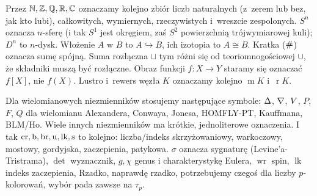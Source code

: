 
Przez $\mathbb N, \mathbb Z, \mathbb Q, \mathbb R, \mathbb C$ oznaczamy kolejno zbiór liczb naturalnych (z~zerem lub bez, jak kto lubi), całkowitych, wymiernych, rzeczywistych i~wreszcie zespolonych.
$S^n$ oznacza $n$-sferę (i tak $S^1$ jest okręgiem, zaś $S^2$ powierzchnią trójwymiarowej kuli); $D^n$ to $n$-dysk.
Włożenie $A$ w $B$ to $A \hookrightarrow B$, ich izotopia to $A \cong B$.
Kratka ($\mathbin{\#}$) oznacza sumę spójną.
Suma rozłączna $\sqcup$ tym różni się od teoriomnogościowej $\cup$, że składniki muszą być rozłączne. Obraz funkcji $f \colon X \to Y$ staramy się oznaczać $f[X]$, nie $f(X)$.
Lustro i~rewers węzła $K$ oznaczamy kolejno $\operatorname{m} K$ i~$\operatorname{r} K$.

Dla wielomianowych niezmienników stosujemy następujące symbole: $\Delta$, $\nabla$, $V$, $P$, $F$, $Q$ dla wielomianu Alexandera, Conwaya, Jonesa, HOMFLY-PT, Kauffmana, BLM/Ho.
Wiele innych niezmienników ma krótkie, jednoliterowe oznaczenia.
I tak $\operatorname{cr}, \operatorname{b}, \operatorname{br}, \operatorname{u}, \operatorname{lk}, \operatorname{s}$ to kolejno: liczba/indeks skrzyżowaniowy, warkoczowy, mostowy, gordyjska, zaczepienia, patykowa.
$\sigma$ oznacza sygnaturę (Levine'a-Tristrama), $\det$ wyznacznik, $g, \chi$ genus i charakterystykę Eulera, $\operatorname{wr}$ spin, $\operatorname{lk}$ indeks zaczepienia, 
Rzadko, naprawdę rzadko, potrzebujemy czegoś dla liczby $p$-kolorowań, wybór pada zawsze na $\tau_p$.


